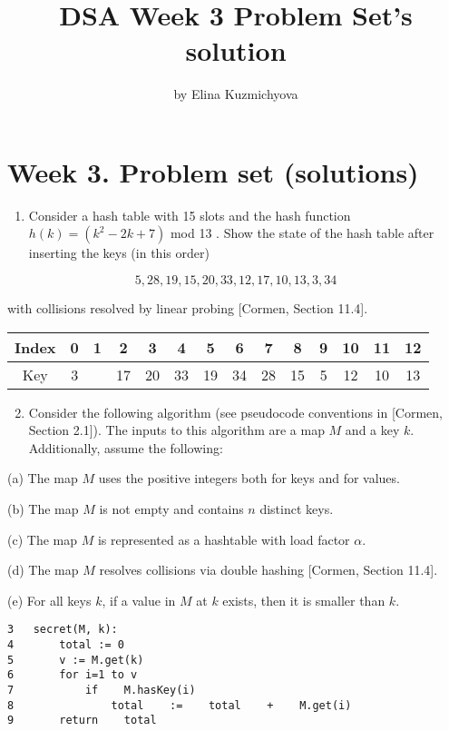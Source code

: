 \documentclass[10pt]{article}
\title{DSA Week 3 Problem Set's solution }
\author{by Elina Kuzmichyova}
\date{}
\begin{document}
\maketitle

\section*{Week 3. Problem set (solutions)}
\begin{enumerate}
  \item Consider a hash table with 15 slots and the hash function $h(k)=\left(k^{2}-2 k+7\right)$ mod 13 . Show the state of the hash table after inserting the keys (in this order)
\end{enumerate}

$$
5,28,19,15,20,33,12,17,10,13,3,34
$$

with collisions resolved by linear probing [Cormen, Section 11.4].

\begin{center}
\begin{tabular}{|c|c|c|c|c|c|c|c|c|c|c|c|c|c|}
\hline
Index & 0 & 1 & 2 & 3 & 4 & 5 & 6 & 7 & 8 & 9 & 10 & 11 & 12 \\
\hline
Key &3& & 17& 20& 33& 19& 34& 28& 15& 5& 12& 10& 13\\
\hline
\end{tabular}
\end{center}

\begin{enumerate}
  \setcounter{enumi}{1}
  \item Consider the following algorithm (see pseudocode conventions in [Cormen, Section 2.1]). The inputs to this algorithm are a map $M$ and a key $k$. Additionally, assume the following:
\end{enumerate}

(a) The map $M$ uses the positive integers both for keys and for values.

(b) The map $M$ is not empty and contains $n$ distinct keys.

(c) The map $M$ is represented as a hashtable with load factor $\alpha$.

(d) The map $M$ resolves collisions via double hashing [Cormen, Section 11.4].

(e) For all keys $k$, if a value in $M$ at $k$ exists, then it is smaller than $k$.


\begin{lstlisting}
3   secret(M, k):
4       total := 0
5       v := M.get(k)
6       for i=1 to v
7           if    M.hasKey(i)
8               total    :=    total    +    M.get(i)
9       return    total
\end{lstlisting}
\begin{center}

\end{center}
\end{document}
